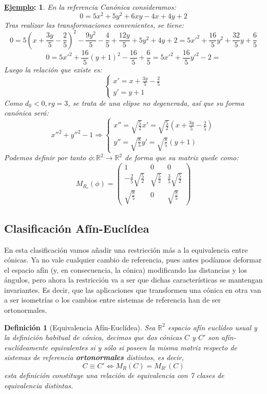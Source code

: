 \documentclass[10pt,a4paper,openright]{book}
\theoremstyle{break}
\newtheorem*{defi}{Definición}
\newtheorem*{ej}{\underline{Ejemplo}:}
\begin{document}
\begin{ej}
En la referencia Canónica consideramos:
$$0 = 5x^2 + 5y^2 + 6xy - 4x + 4y + 2$$
Tras realizar las transformaciones convenientes, se tiene:
$$0 =5 (x + \frac{3y}{5} - \frac{2}{5})^2 - \frac{9y^2}{5} - \frac{4}{5} + \frac{12y}{5} + 5y^2 + 4y + 2 = 5x'^2 + \frac{16}{5} y^2 + \frac{32}{5} y + \frac{6}{5}$$
$$0 = 5x'^2 + \frac{16}{5} (y + 1)^2 - \frac{16}{5} + \frac{6}{5} = 5x'^2 + \frac{16}{5} y'^2 - 2 = $$
Luego la relación que existe es:
$$\begin{cases} x' = x + \frac{3y}{5} - \frac{2}{5} \\ y' = y + 1 \end{cases}$$
Como $ d_0 < 0, rg = 3$, se trata de una elipse no degenerada, así que su forma canónica será:
$$x''^2 + y''^2 - 1 \Rightarrow \begin{cases} x'' = \sqrt{\frac{5}{2}} x' =  \sqrt{\frac{5}{2}} (x + \frac{3y}{5} - \frac{2}{5})  \\ y'' = \sqrt{\frac{8}{5}} y' = \sqrt{\frac{8}{5}} (y+1)\end{cases}$$
Podemos definir por tanto $\phi : \mathbb{R}^2 \to  \mathbb{R}^2$ de forma que su matriz quede como:
$$M_{R_c} (\phi)= \left(\begin{array}{c|cc}
1 & 0 & 0 \\
\hline
- \frac{2}{5}\sqrt{\frac{5}{2}}  & \sqrt{\frac{5}{2}}  & \frac{3}{5}\sqrt{\frac{5}{2}}  \\
\sqrt{\frac{8}{5}} &  0 & \sqrt{\frac{8}{5}}
\end{array}
\right) $$
\end{ej}

\subsection{Clasificación Afín-Euclídea}
En esta clasificación vamos añadir una restricción más a la equivalencia entre cónicas. Ya no vale cualquier cambio de referencia, pues antes podíamos deformar el espacio afín (y, en consecuencia, la cónica) modificando las distancias y los ángulos, pero ahora la restricción va a ser que dichas características se mantengan invariantes. Es decir, que las aplicaciones que transformen una cónica en otra van a ser isometrías o los cambios entre sistemas de referencia han de ser ortonormales.

\begin{defi}[Equivalencia Afín-Euclídea]
Sea $\mathbb{R}^2$ espacio afín euclídeo usual y la definición habitual de cónica, decimos que dos cónicas $C$ y $C'$ son afín-euclídeamente equivalentes si y sólo si poseen la misma matriz respecto de sistemas de referencia \textbf{ortonormales} distintos, es decir,
$$C \equiv C' \Leftrightarrow M_R(C) = M_{R'} (C)$$
esta definición constituye una relación de equivalencia con 7 clases de equivalencia distintas.
\end{defi}
\end{document}
